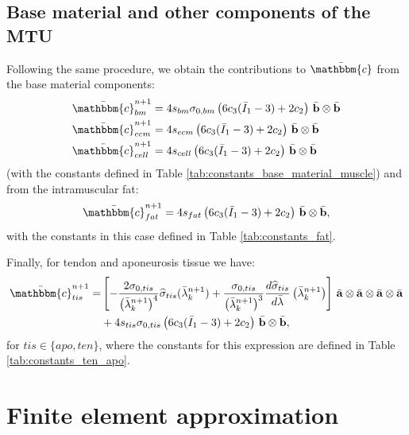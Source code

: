 \documentclass{sfuthesis}
\numberwithin{equation}{section}
\numberwithin{figure}{chapter}
\numberwithin{table}{chapter}
\theoremstyle{definition}
\def\*#1{{\mathbf{#1}}} %
\newcommand{\der}[2]{\dfrac{d #1}{d #2}}
\newcommand{\I}{{\bar{I}}}
\renewcommand{\c}{\mathbbm{c}}
\begin{document}
\subsection{Base material and other components of the MTU}

Following the same procedure, we obtain the contributions to $\bar{\c}$ from the base material components:
\begin{align}
    \bar{\c}_{bm}^{n+1} &= 4 s_{bm} \sigma_{0,bm} \left( 6 c_3 (\I_1-3) + 2c_2 \right) \, \bar{\*b} \otimes \bar{\*b} \\
    \bar{\c}_{ecm}^{n+1} &= 4 s_{ecm} \left( 6 c_3 (\I_1-3) + 2c_2 \right) \, \bar{\*b} \otimes \bar{\*b} \\
    \bar{\c}_{cell}^{n+1} &= 4 s_{cell} \left( 6 c_3 (\I_1-3) + 2c_2 \right) \, \bar{\*b} \otimes \bar{\*b}
\end{align}
(with the constants defined in Table \ref{tab:constants_base_material_muscle}) and from the intramuscular fat:
\begin{equation}
    \bar{\c}_{fat}^{n+1} = 4 s_{fat} \left( 6 c_3 (\I_1-3) + 2c_2 \right) \, \bar{\*b} \otimes \bar{\*b},
\end{equation}
with the constants in this case defined in Table \ref{tab:constants_fat}.

Finally, for tendon and aponeurosis tissue we have:
\begin{align}
    \notag \bar{\c}_{tis}^{n+1} = &\left[- \dfrac{2\sigma_{0,tis}}{\left(\bar\lambda^{n+1}_k\right)^4}  \widehat{\sigma}_{tis}(\bar\lambda^{n+1}_k) + \dfrac{\sigma_{0,tis}}{\left(\bar\lambda^{n+1}_k \right)^3}  \der{\widehat{\sigma}_{tis}}{\bar{\lambda}}\left(\bar\lambda^{n+1}_k\right) \right] \, \bar{\*a} \otimes \bar{\*a} \otimes \bar{\*a} \otimes \bar{\*a} \\
    &+ 4 s_{tis} \sigma_{0,tis} \left( 6 c_3 (\I_1-3) + 2c_2 \right) \, \bar{\*b} \otimes \bar{\*b},
\end{align}
for $tis \in \{apo,ten\}$, where the constants for this expression are defined in Table \ref{tab:constants_ten_apo}.

\section{Finite element approximation} \label{sec:finite_element_approximation}
\end{document}
